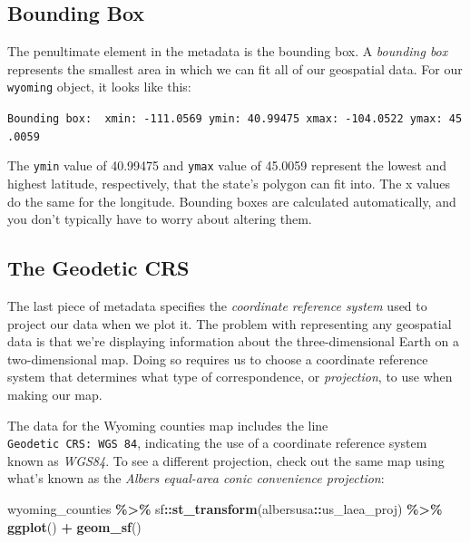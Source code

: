 \documentclass[
]{book}
\newenvironment{Shaded}{\begin{snugshade}}{\end{snugshade}}
\newcommand{\FunctionTok}[1]{\textcolor[rgb]{0.13,0.29,0.53}{\textbf{#1}}}
\newcommand{\NormalTok}[1]{#1}
\newcommand{\SpecialCharTok}[1]{\textcolor[rgb]{0.81,0.36,0.00}{\textbf{#1}}}
\begin{document}
\hypertarget{bounding-box}{%
\subsection*{Bounding Box}\label{bounding-box}}

The penultimate element in the metadata is the bounding box. A \emph{bounding box} represents the smallest area in which we can fit all of our geospatial data. For our \texttt{wyoming} object, it looks like this:

\texttt{Bounding\ box:\ \ xmin:\ -111.0569\ ymin:\ 40.99475\ xmax:\ -104.0522\ ymax:\ 45.0059}

The \texttt{ymin} value of 40.99475 and \texttt{ymax} value of 45.0059 represent the lowest and highest latitude, respectively, that the state's polygon can fit into. The x values do the same for the longitude. Bounding boxes are calculated automatically, and you don't typically have to worry about altering them.

\hypertarget{the-geodetic-crs}{%
\subsection*{The Geodetic CRS}\label{the-geodetic-crs}}

The last piece of metadata specifies the \emph{coordinate reference system} used to project our data when we plot it. The problem with representing any geospatial data is that we're displaying information about the three-dimensional Earth on a two-dimensional map. Doing so requires us to choose a coordinate reference system that determines what type of correspondence, or \emph{projection}, to use when making our map.

The data for the Wyoming counties map includes the line \texttt{Geodetic\ CRS:\ WGS\ 84}, indicating the use of a coordinate reference system known as \emph{WGS84}. To see a different projection, check out the same map using what's known as the \emph{Albers equal-area conic convenience projection}:

\begin{Shaded}
\begin{Highlighting}[]
\NormalTok{wyoming\_counties }\SpecialCharTok{\%\textgreater{}\%}
\NormalTok{  sf}\SpecialCharTok{::}\FunctionTok{st\_transform}\NormalTok{(albersusa}\SpecialCharTok{::}\NormalTok{us\_laea\_proj) }\SpecialCharTok{\%\textgreater{}\%}
  \FunctionTok{ggplot}\NormalTok{() }\SpecialCharTok{+}
  \FunctionTok{geom\_sf}\NormalTok{()}
\end{Highlighting}
\end{Shaded}
\end{document}
